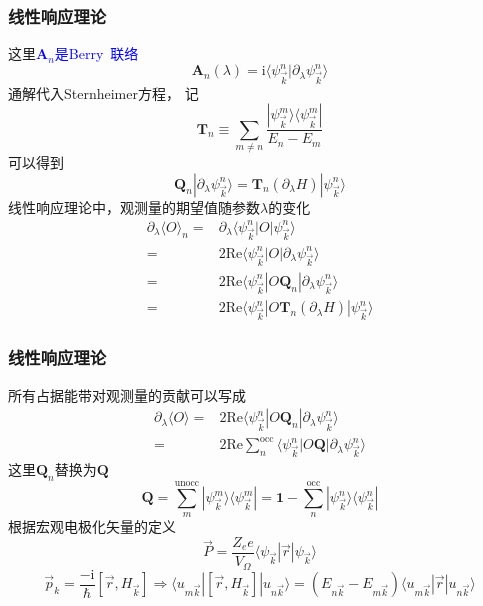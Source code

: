 {\frame
{
	\frametitle{线性响应理论}
	这里\textcolor{blue}{$\mathbf{A}_n$是\textrm{Berry~}联络}
	\begin{displaymath}
		\mathbf{A}_n(\lambda)=\mathrm{i}\langle\psi_{\vec k}^{n}|\partial_{\lambda}\psi_{\vec k}^{n}\rangle
	\end{displaymath}
	通解代入\textrm{Sternheimer}方程，
记
\begin{displaymath}
	\mathbf{T}_n\equiv\sum_{m\neq n}\dfrac{|\psi_{\vec k}^{m}\rangle\langle\psi_{\vec k}^{m}|}{E_n-E_m}
\end{displaymath}
	可以得到
	\begin{displaymath}
		\mathbf{Q}_n|\partial_{\lambda}\psi_{\vec k}^{n}\rangle=\mathbf{T}_n(\partial_{\lambda}H)|\psi_{\vec k}^{n}\rangle
	\end{displaymath}
	线性响应理论中，观测量的期望值随参数$\lambda$的变化
	\begin{displaymath}
		\begin{aligned}
			\partial_{\lambda}\langle O\rangle_n=&\partial_{\lambda}\langle\psi_{\vec k}^{n}|O|\psi_{\vec k}^{n}\rangle\\
			=&2\mathrm{Re}\langle\psi_{\vec k}^{n}|O|\partial_{\lambda}\psi_{\vec k}^{n}\rangle\\
			=&2\mathrm{Re}\langle\psi_{\vec k}^{n}|O\mathbf{Q}_n|\partial_{\lambda}\psi_{\vec k}^{n}\rangle\\
			=&2\mathrm{Re}\langle\psi_{\vec k}^{n}|O\mathbf{T}_n(\partial_{\lambda}H)|\psi_{\vec k}^{n}\rangle
		\end{aligned}
	\end{displaymath}
}

\frame
{
	\frametitle{线性响应理论}
	所有占据能带对观测量的贡献可以写成
	\begin{displaymath}
		\begin{aligned}
			\partial_{\lambda}\langle O\rangle=&2\mathrm{Re}\langle\psi_{\vec k}^{n}|O\mathbf{Q}_n|\partial_{\lambda}\psi_{\vec k}^{n}\rangle\\
			=&2\mathrm{Re}\sum_{n}^{\mathrm{occ}}\langle\psi_{\vec k}^{n}|O\mathbf{Q}|\partial_{\lambda}\psi_{\vec k}^{n}\rangle
		\end{aligned}
	\end{displaymath}
	这里$\mathbf{Q}_n$替换为$\mathbf{Q}$
	\begin{displaymath}
		\mathbf{Q}=\sum_m^{\mathrm{unocc}}|\psi_{\vec k}^{m}\rangle\langle\psi_{\vec k}^{m}|=\mathbf{1}-\sum_{n}^{\mathrm{occ}}|\psi_{\vec k}^{n}\rangle\langle\psi_{\vec k}^{n}|
	\end{displaymath}
	根据宏观电极化矢量的定义
	\begin{displaymath}
		\vec P=\dfrac{Z_ee}{V_{\Omega}}\langle\psi_{\vec k}|\vec r|\psi_{\vec k}\rangle
	\end{displaymath}
	\begin{displaymath}
		\vec p_k=\dfrac{-\mathrm{i}}{\hbar}[\vec r,H_{\vec k}]\Longrightarrow\langle u_{m\vec k}|[\vec r,H_{\vec k}]|u_{n\vec k}\rangle=(E_{n\vec k}-E_{m\vec k})\langle u_{m\vec k}|\vec r|u_{n\vec k}\rangle
	\end{displaymath}
}

}
